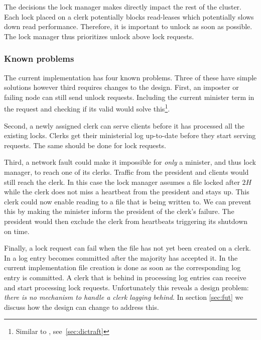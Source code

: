 The decisions the lock manager makes directly impact the rest of the cluster. Each lock placed on a clerk potentially blocks read-leases which potentially slows down read performance. Therefore, it is important to unlock as soon as possible. The lock manager thus prioritizes unlock above lock requests.
%
\subsubsection*{Known problems}
The current implementation has four known problems. Three of these have simple solutions however third requires changes to the design. First, an imposter or failing node can still send unlock requests. Including the current minister term in the request and checking if its valid would solve this\footnote{Similar to \graft{}, see~\cref{sec:dictraft}}. 

Second, a newly assigned clerk can serve clients before it has processed all the existing locks. Clerks get their ministerial \raft{} log up-to-date before they start serving requests. The same should be done for lock requests. 

Third, a network fault could make it impossible for \textit{only} a minister, and thus lock manager, to reach one of its clerks. Traffic from the president and clients would still reach the clerk. In this case the lock manager assumes a file locked after $2H$ while the clerk does not miss a heartbeat from the president and stays up. This clerk could now enable reading to a file that is being written to. We can prevent this by making the minister inform the president of the clerk's failure. The president would then exclude the clerk from heartbeats triggering its shutdown on time. 

Finally, a lock request can fail when the file has not yet been created on a clerk. In \raft{} a log entry becomes committed after the majority has accepted it. In the current implementation file creation is done as soon as the corresponding log entry is committed. A clerk that is behind in processing log entries can receive and start processing lock requests. Unfortunately this reveals a design problem: \textit{there is no mechanism to handle a clerk lagging behind}. In section \cref{sec:fut} we discuss how the design can change to address this.
